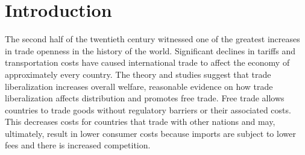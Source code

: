 \documentclass[a4paper,12pt]{article}
\begin{document}
\section{Introduction}
The second half of the twentieth century witnessed one of the greatest increases in trade openness in the history of the world. Significant declines in tariffs and transportation costs have caused international trade to affect the economy of approximately every country. The theory and studies suggest that trade liberalization increases overall welfare, reasonable evidence on how trade liberalization affects distribution  and promotes free trade. \cite{NBERw12885} Free trade allows countries to trade goods without regulatory barriers or their associated costs. This decreases costs for countries that trade with other nations and may, ultimately, result in lower consumer costs because imports are subject to lower fees and there is increased competition. 
\end{document}
